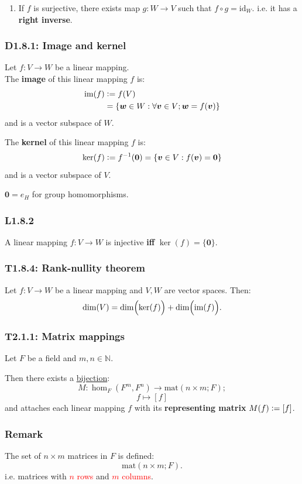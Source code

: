 \documentclass{article}
\newcommand{\deq}{\vcentcolon=}
\newcommand{\vc}[1]{\boldsymbol{#1}}
\begin{document}
\begin{multicols*}{3}
\begin{enumerate}
    \item If $f$ is surjective, there exists map
    $g:W\rightarrow V$ such that $f\circ g=\text{id}_W$.
    i.e. it has a \textbf{right inverse}.
\end{enumerate}

\subsubsection*{D1.8.1: Image and kernel}
Let $f:V\rightarrow W$ be a linear mapping. \\
The \textbf{image} of this linear mapping $f$ is:
\begin{align*}
    \text{im}(f)&\deq f(V) \\
    &=\{\vc{w}\in W:
    \forall\vc{v}\in V;\vc{w}=f(\vc{v})\}
\end{align*}
and is a vector subspace of $W$.

The \textbf{kernel} of this linear mapping $f$ is:
$$\ker(f)\deq f^{-1}(\vc{0})
=\{\vc{v}\in V:f(\vc{v})=\vc{0}\}$$
and is a vector subspace of $V$.

$\vc{0}=e_H$ for group homomorphisms.

\subsubsection*{L1.8.2}
A linear mapping $f:V\rightarrow W$ is injective
\textbf{if{}f} $\ker(f)=\{\vc{0}\}$.

\subsubsection*{T1.8.4: Rank-nullity theorem}
Let $f:V\rightarrow W$ be a linear mapping and
$V,W$ are vector spaces. Then:
$$\dim(V)=\dim\Bigl(\ker(f)\Bigr)
+\dim\Bigl(\text{im}(f)\Bigr).$$

\subsubsection*{T2.1.1: Matrix mappings}
Let $F$ be a field and $m,n\in\mathbb{N}$.

Then there exists a \underline{bijection}:
$$M:\hom_F(F^m,F^n)\rightarrow\text{mat}(n\times m;F);$$
$$f\mapsto[f]$$
and attaches each linear mapping $f$ with its
\textbf{representing matrix} $M(f)\deq[f]$.

\subsubsection*{Remark}
The set of $n\times m$ matrices in $F$ is defined:
$$\text{mat}(n\times m;F).$$
i.e. 
matrices with \textcolor{red}{$n$ rows}
and \textcolor{red}{$m$ columns}.



\end{multicols*}
\end{document}
